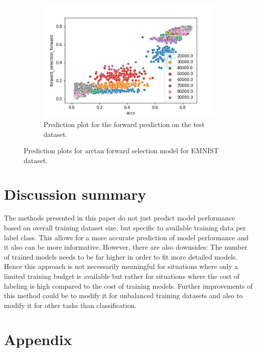 \documentclass{article} %
\begin{document}
\begin{figure}
\begin{subfigure}{.33\textwidth}
        \includegraphics[width=.98\linewidth]{emnist/arctan_all_epochs_forward_selection_train.jpg}
        \caption{Prediction plot for the forward prediction on the test dataset.}
        \label{fig:emnist_prediction_plot_val}
    \end{subfigure}
    \caption{Prediction plots for arctan forward selection model for EMNIST dataset.}
    \label{fig:emnist_prediction_plot}
\end{figure}

\section{Discussion summary}

The methods presented in this paper do not just predict model performance based on overall training dataset size, but specific to available training data per label class.
This allows for a more accurate prediction of model performance and it also can be more informative.
However, there are also downsides: The number of trained models needs to be far higher in order to fit more detailed models.
Hence this approach is not necessarily meaningful for situations where only a limited training budget is available but rather for situations where the cost of labeling is high compared to the cost of training models.
Further improvements of this method could be to modify it for unbalanced training datasets and also to modify it for other tasks than classification.

\pagebreak



\section*{Appendix}
\end{document}

